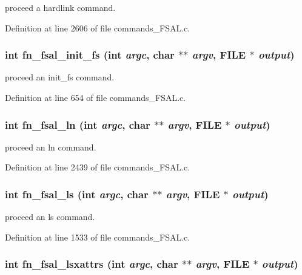 proceed a hardlink command. 

Definition at line 2606 of file commands\_\-FSAL.c.
\subsubsection[{fn\_\-fsal\_\-init\_\-fs}]{\setlength{\rightskip}{0pt plus 5cm}int fn\_\-fsal\_\-init\_\-fs (int {\em argc}, \/  char $\ast$$\ast$ {\em argv}, \/  FILE $\ast$ {\em output})}\label{commands__FSAL_8c_1c17fec3f6f369ed33c6e6881c7600e1}


proceed an init\_\-fs command. 

Definition at line 654 of file commands\_\-FSAL.c.
\subsubsection[{fn\_\-fsal\_\-ln}]{\setlength{\rightskip}{0pt plus 5cm}int fn\_\-fsal\_\-ln (int {\em argc}, \/  char $\ast$$\ast$ {\em argv}, \/  FILE $\ast$ {\em output})}\label{commands__FSAL_8c_8499a47dcd7307683cfde786a7bed5e2}


proceed an ln command. 

Definition at line 2439 of file commands\_\-FSAL.c.
\subsubsection[{fn\_\-fsal\_\-ls}]{\setlength{\rightskip}{0pt plus 5cm}int fn\_\-fsal\_\-ls (int {\em argc}, \/  char $\ast$$\ast$ {\em argv}, \/  FILE $\ast$ {\em output})}\label{commands__FSAL_8c_07b7bb33d2fb103bd10446701b19015d}


proceed an ls command. 

Definition at line 1533 of file commands\_\-FSAL.c.
\subsubsection[{fn\_\-fsal\_\-lsxattrs}]{\setlength{\rightskip}{0pt plus 5cm}int fn\_\-fsal\_\-lsxattrs (int {\em argc}, \/  char $\ast$$\ast$ {\em argv}, \/  FILE $\ast$ {\em output})}\label{commands__FSAL_8c_00fa31116fbbb892b0dfdd2b4b5d0c48}


